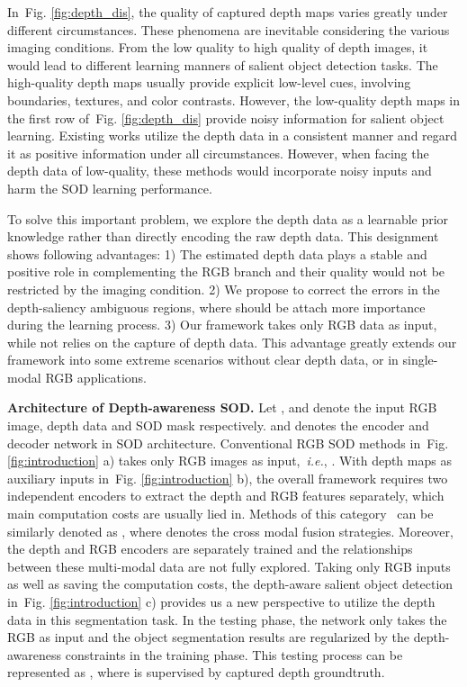 \documentclass[journal]{IEEEtran}
\def\ie{{\em i.e.}}
\newcommand{\figref}[1]{Fig. \ref{#1}}
\begin{document}
In~\figref{fig:depth_dis}, the quality of captured depth maps varies greatly under different circumstances. These phenomena are inevitable considering the various imaging conditions. From the low quality to high quality of depth images, it would lead to different learning manners of salient object detection tasks. The high-quality depth maps usually provide explicit low-level cues, involving boundaries, textures, and color contrasts. However, the low-quality depth maps in the first row of~\figref{fig:depth_dis} provide noisy information for salient object learning. Existing works utilize the depth data in a consistent manner and regard it as positive information under all circumstances. However, when facing the depth data of low-quality, these methods would incorporate noisy inputs and harm the SOD learning performance.

To solve this important problem, we explore the depth data as a learnable prior knowledge rather than directly encoding the raw depth data. This designment shows following advantages:
 1) The estimated depth data plays a stable and positive role in complementing the RGB branch and their quality would not be restricted by the imaging condition.
2) We propose to correct the errors in the depth-saliency ambiguous regions, where should be attach more importance during the learning process.
3) Our framework takes only RGB data as input, while not relies on the capture of depth data. This advantage greatly extends our framework into some extreme scenarios without clear depth data, or in single-modal RGB applications.


\textbf{Architecture of Depth-awareness SOD.} Let ,  and  denote the input RGB image, depth data and SOD mask respectively.  and  denotes the encoder and decoder network in SOD architecture.  Conventional RGB SOD methods in~\figref{fig:introduction} a) takes only RGB images as input,~\ie, . With depth maps as auxiliary inputs in~\figref{fig:introduction} b), the overall framework requires two independent encoders to extract the depth and RGB features separately, which main computation costs are usually lied in. Methods of this category~\cite{fan2020bbs,liu2020learning} can be similarly denoted as , where  denotes the cross modal fusion strategies.
Moreover, the depth and RGB encoders are separately trained and the relationships between these multi-modal data are not fully explored.
Taking only RGB inputs as well as saving the computation costs, the depth-aware salient object detection in~\figref{fig:introduction} c) provides us a new perspective to utilize the depth data in this segmentation task. In the testing phase, the network only takes the RGB as input and the object segmentation results are regularized by the depth-awareness constraints in the training phase. This testing process can be represented as , where  is supervised by captured depth groundtruth.
\end{document}
